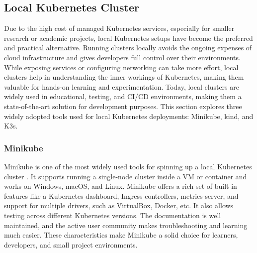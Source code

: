 \subsection{Local Kubernetes Cluster}
Due to the high cost of managed Kubernetes services, especially for smaller research or academic projects, local Kubernetes setups have become the preferred and practical alternative. Running clusters locally avoids the ongoing expenses of cloud infrastructure and gives developers full control over their environments. While exposing services or configuring networking can take more effort, local clusters help in understanding the inner workings of Kubernetes, making them valuable for hands-on learning and experimentation. Today, local clusters are widely used in educational, testing, and CI/CD environments, making them a state-of-the-art solution for development purposes. This section explores three widely adopted tools used for local Kubernetes deployments: Minikube, kind, and K3s.

\subsubsection{Minikube}
Minikube is one of the most widely used tools for spinning up a local Kubernetes cluster \cite{minikube-docs}. It supports running a single-node cluster inside a VM or container and works on Windows, macOS, and Linux. Minikube offers a rich set of built-in features like a Kubernetes dashboard, Ingress controllers, metrics-server, and support for multiple drivers, such as VirtualBox, Docker, etc. It also allows testing across different Kubernetes versions. The documentation is well maintained, and the active user community makes troubleshooting and learning much easier. These characteristics make Minikube a solid choice for learners, developers, and small project environments.

